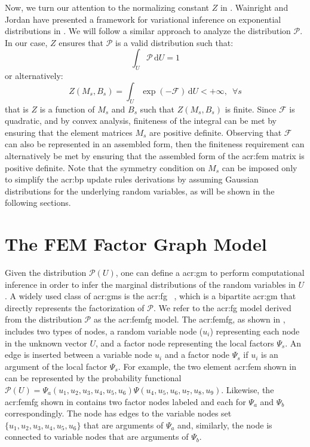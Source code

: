 Now, we turn our attention to the normalizing constant $Z$ in .
Wainright and Jordan have presented a framework for variational inference on exponential distributions in \cite{bib:Wainwright2008GMEFAVI}.
We will follow a similar approach to analyze the distribution $\mathcal{P}$.
In our case, $Z$ ensures that $\mathcal{P}$ is a valid distribution such that:
\begin{equation}
	\int_U \mathcal{P}\, \mathrm{d} U = 1
\end{equation}
or alternatively:
\begin{equation}
	Z(M_s,B_s) = \int_U \exp \left( \mathcal{-F} \right)\, \mathrm{d} U <+\infty,\,\,\,\forall s
\end{equation}
that is $Z$ is a function of $M_s$ and $B_s$ such that $Z(M_s,B_s)$ is finite.
Since $\mathcal{F}$ is quadratic, and by convex analysis, finiteness of the integral can be met by ensuring that the element matrices $M_s$ are positive definite.
Observing that $\mathcal{F}$ can also be represented in an assembled form, then the finiteness requirement can alternatively be met by ensuring that the assembled form of the \gls{acr:fem} matrix is positive definite.
Note that the symmetry condition on $M_s$ can be imposed only to simplify the \gls{acr:bp} update rules derivations by assuming Gaussian distributions for the underlying random variables, as will be shown in the following sections.


\section{The FEM Factor Graph Model}
\label{sec:FEMFG}

Given the distribution $\mathcal{P}(U)$, one can define a \gls{acr:gm} to perform computational inference in order to infer the marginal distributions of the random variables in $U$.
A widely used class of \glspl{acr:gm} is the \gls{acr:fg} ~\cite{bib:Kschischang2001FGATSA}, which is a bipartite \gls{acr:gm} that directly represents the factorization of $\mathcal{P}$.
We refer to the \gls{acr:fg} model derived from the distribution $\mathcal{P}$ as the \gls{acr:femfg} model.
The \gls{acr:femfg}, as shown in , includes two types of nodes, a random variable node ($u_i$) representing each node in the unknown vector $U$, and a factor node representing the local factors $\Psi_s$.
An edge is inserted between a variable node $u_i$ and a factor node $\Psi_s$ if $u_i$ is an argument of the local factor $\Psi_s$.
For example, the two element \gls{acr:fem} shown in  can be represented by the probability functional $\mathcal{P}(U)=\Psi_a(u_1,u_2,u_3,u_4,u_5,u_6)\Psi(u_4,u_5,u_6,u_7,u_8,u_9)$.  Likewise, the \gls{acr:femfg} shown in  contains two factor nodes labeled  and  each for $\Psi_a$ and $\Psi_b$ correspondingly.
The node  has edges to the variable nodes set $\{u_1,u_2,u_3,u_4,u_5,u_6\}$ that are arguments of $\Psi_a$ and, similarly, the node  is connected to variable nodes that are arguments of $\Psi_b$.



